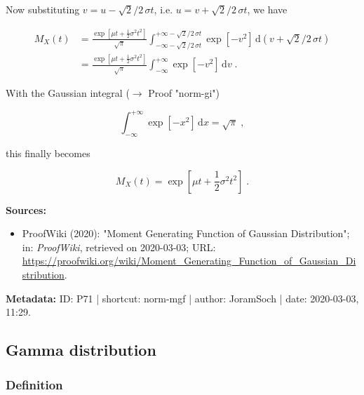\documentclass[a4paper,12pt,twoside]{book}
\begin{document}
Now substituting $v = u - \sqrt{2}/2 \, \sigma t$, i.e. $u = v + \sqrt{2}/2 \, \sigma t$, we have

\begin{equation} \label{eq:norm-mgf-norm-mgf-s3}
\begin{split}
M_X(t) &= \frac{\exp\left[ \mu t + \frac{1}{2} \sigma^2 t^2 \right]}{\sqrt{\pi}} \int_{-\infty - \sqrt{2}/2 \, \sigma t}^{+\infty - \sqrt{2}/2 \, \sigma t} \exp\left[ -v^2 \right] \, \mathrm{d}\left( v + \sqrt{2}/2 \, \sigma t \right) \\
&= \frac{\exp\left[ \mu t + \frac{1}{2} \sigma^2 t^2 \right]}{\sqrt{\pi}} \int_{-\infty}^{+\infty} \exp\left[ -v^2 \right] \, \mathrm{d}v \; .
\end{split}
\end{equation}

With the Gaussian integral ($\rightarrow$ Proof "norm-gi")

\begin{equation} \label{eq:norm-mgf-gauss}
\int_{-\infty}^{+\infty} \exp\left[ -x^2 \right] \, \mathrm{d}x = \sqrt{\pi} \; ,
\end{equation}

this finally becomes

\begin{equation} \label{eq:norm-mgf-norm-mgf-qed}
M_X(t) = \exp\left[ \mu t + \frac{1}{2} \sigma^2 t^2 \right] \; .
\end{equation}


\vspace{1em}
\textbf{Sources:}
\begin{itemize}
\item ProofWiki (2020): "Moment Generating Function of Gaussian Distribution"; in: \textit{ProofWiki}, retrieved on 2020-03-03; URL: \url{https://proofwiki.org/wiki/Moment_Generating_Function_of_Gaussian_Distribution}.
\end{itemize}


\vspace{1em}
\textbf{Metadata:} ID: P71 | shortcut: norm-mgf | author: JoramSoch | date: 2020-03-03, 11:29.
\vspace{1em}



\subsection{Gamma distribution}

\subsubsection[\textit{Definition}]{Definition} \label{sec:gam}
\setcounter{equation}{0}
\end{document}
